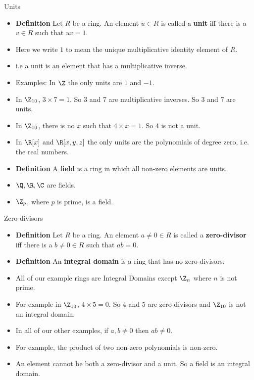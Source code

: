 \documentclass{beamer}
\begin{document}

\begin{frame}{Units}

\begin{itemize}
  \item \textbf{Definition} Let $R$ be a ring. An element $u\in R$ is called a \textbf{unit} iff there is a $v\in R$ such that $uv=1$.
  \item Here we write $1$ to mean the unique multiplicative identity element of $R$.
  \item i.e a unit is an element that has a multiplicative inverse.
  \item Examples: In $\Z$ the only units are $1$ and $-1$.
  \item In $\Z_{10}$, $3\times 7 = 1$. So $3$ and $7$ are multiplicative inverses. So $3$ and $7$ are units.
  \item In $\Z_{10}$, there is no $x$ such that $4\times x = 1$. So $4$ is not a unit.
  \item In $\R[x]$ and $\R[x,y,z]$ the only units are the polynomials of degree zero, i.e. the real numbers.
  \item \textbf{Definition} A \textbf{field} is a ring in which all non-zero elements are units.
  \item $\Q, \R, \C$ are fields.
  \item $\Z_p$, where $p$ is prime, is a field.
\end{itemize}

\end{frame}


\begin{frame}{Zero-divisors}

\begin{itemize}
  \item \textbf{Definition} Let $R$ be a ring. An element $a\not=0\in R$ is called a \textbf{zero-divisor} iff there is a $b\not=0\in R$ such that $ab=0$.
  \item \textbf{Definition} An \textbf{integral domain} is a ring that has no zero-divisors.
  \item All of our example rings are Integral Domains except $\Z_n$ where $n$ is not prime.
  \item For example in $\Z_{10}$, $4\times 5 = 0$. So $4$ and $5$ are zero-divisors and $\Z_{10}$ is not an integral domain.
  \item In all of our other examples, if $a,b\not=0$ then $ab \not = 0$.
  \item For example, the product of two non-zero polynomials is non-zero.
  \item An element cannot be both a zero-divisor and a unit. So a field is an integral domain.
\end{itemize}

\end{frame}
\end{document}
